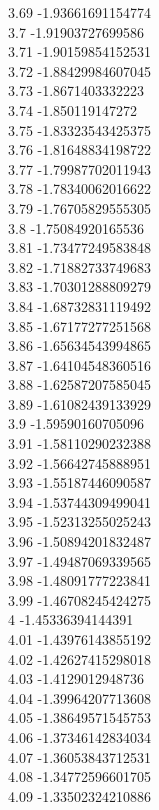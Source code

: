 {3.69	-1.93661691154774\\
3.7	-1.91903727699586\\
3.71	-1.90159854152531\\
3.72	-1.88429984607045\\
3.73	-1.8671403332223\\
3.74	-1.850119147272\\
3.75	-1.83323543425375\\
3.76	-1.81648834198722\\
3.77	-1.79987702011943\\
3.78	-1.78340062016622\\
3.79	-1.76705829555305\\
3.8	-1.75084920165536\\
3.81	-1.73477249583848\\
3.82	-1.71882733749683\\
3.83	-1.70301288809279\\
3.84	-1.68732831119492\\
3.85	-1.67177277251568\\
3.86	-1.65634543994865\\
3.87	-1.64104548360516\\
3.88	-1.62587207585045\\
3.89	-1.61082439133929\\
3.9	-1.59590160705096\\
3.91	-1.58110290232388\\
3.92	-1.56642745888951\\
3.93	-1.55187446090587\\
3.94	-1.53744309499041\\
3.95	-1.52313255025243\\
3.96	-1.50894201832487\\
3.97	-1.49487069339565\\
3.98	-1.48091777223841\\
3.99	-1.46708245424275\\
4	-1.45336394144391\\
4.01	-1.43976143855192\\
4.02	-1.42627415298018\\
4.03	-1.4129012948736\\
4.04	-1.39964207713608\\
4.05	-1.38649571545753\\
4.06	-1.37346142834034\\
4.07	-1.36053843712531\\
4.08	-1.34772596601705\\
4.09	-1.33502324210886\\
}
